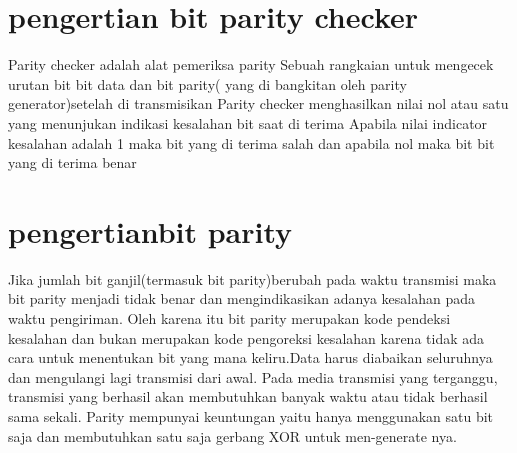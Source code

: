 \section{pengertian bit parity checker}
Parity checker adalah alat pemeriksa parity
Sebuah rangkaian untuk mengecek urutan bit bit data dan bit parity( yang di bangkitan  oleh parity generator)setelah di transmisikan
Parity checker menghasilkan nilai nol atau satu yang menunjukan indikasi kesalahan bit saat di terima
Apabila nilai indicator  kesalahan adalah 1 maka bit yang di terima salah dan apabila nol maka bit bit yang di terima benar

\section{pengertianbit parity}
Jika jumlah bit ganjil(termasuk bit parity)berubah pada waktu transmisi maka bit parity menjadi tidak benar dan mengindikasikan adanya kesalahan pada waktu pengiriman. Oleh karena itu bit parity merupakan kode pendeksi kesalahan dan bukan merupakan kode pengoreksi kesalahan karena tidak ada cara untuk menentukan bit yang mana keliru.Data harus diabaikan seluruhnya dan mengulangi lagi transmisi dari awal. Pada media transmisi yang terganggu, transmisi yang berhasil akan membutuhkan banyak waktu atau tidak berhasil sama sekali. Parity mempunyai keuntungan yaitu hanya menggunakan satu bit saja dan membutuhkan satu saja gerbang XOR untuk men-generate nya.